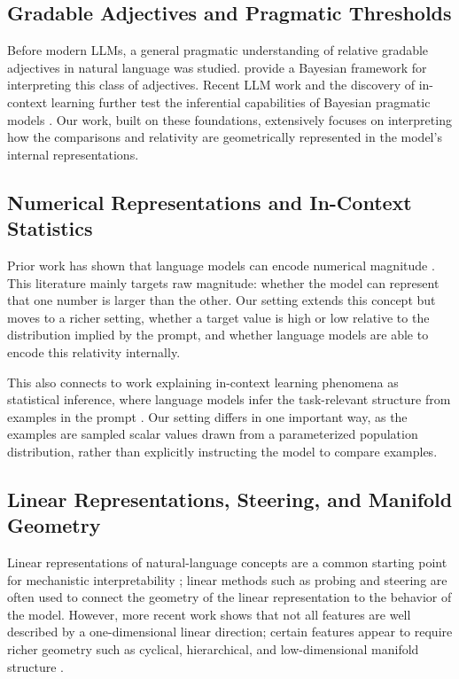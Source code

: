 \documentclass{article}
\begin{document}
\subsection{Gradable Adjectives and Pragmatic Thresholds}
\label{subsec:related-gradability}

Before modern LLMs, a general pragmatic understanding of relative gradable adjectives in natural language was studied. \citet{lassiter2017adjectival} provide a Bayesian framework for interpreting this class of adjectives. Recent LLM work and the discovery of in-context learning further test the inferential capabilities of Bayesian pragmatic models \citep{lipkin2023pragmatic}. Our work, built on these foundations, extensively focuses on interpreting how the comparisons and relativity are geometrically represented in the model's internal representations.

\subsection{Numerical Representations and In-Context Statistics}
\label{subsec:related-numbers}

Prior work has shown that language models can encode numerical magnitude \citep{zhu2024value}. This literature mainly targets raw magnitude: whether the model can represent that one number is larger than the other. Our setting extends this concept but moves to a richer setting, whether a target value is high or low relative to the distribution implied by the prompt, and whether language models are able to encode this relativity internally.

This also connects to work explaining in-context learning phenomena as statistical inference, where language models infer the task-relevant structure from examples in the prompt \citep{xie2022implicitbayesian,he2025linearregression}. Our setting differs in one important way, as the examples are sampled scalar values drawn from a parameterized population distribution, rather than explicitly instructing the model to compare examples.

\subsection{Linear Representations, Steering, and Manifold Geometry}
\label{subsec:related-mi}

Linear representations of natural-language concepts are a common starting point for mechanistic interpretability \citep{park2024linear,park2025categorical}; linear methods such as probing and steering are often used to connect the geometry of the linear representation to the behavior of the model.
However, more recent work shows that not all features are well described by a one-dimensional linear direction; certain features appear to require richer geometry such as cyclical, hierarchical, and low-dimensional manifold structure \citep{engels2024notlinear,modellerubin2025manifolds,sarfati2026beliefs,gurnee2026manifold}.
\end{document}
